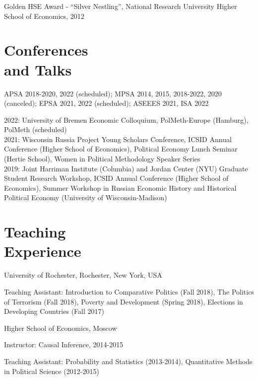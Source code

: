 \documentclass[margin,line,10.95pt]{res}
\newenvironment{list1}{
  \begin{list}{\ding{113}}{%
      \setlength{\itemsep}{0in}
      \setlength{\parsep}{0in} \setlength{\parskip}{0in}
      \setlength{\topsep}{0in} \setlength{\partopsep}{0in}
      \setlength{\leftmargin}{0.17in}}}{\end{list}}
\begin{document}
\begin{resume}
Golden HSE Award - ``Silver Nestling'', National Research University Higher School of Economics, 2012
\vspace*{-2.5mm}


\section{\sc Conferences \\ and Talks}

APSA 2018-2020, 2022 (scheduled); MPSA 2014, 2015, 2018-2022, 2020 (canceled); EPSA 2021, 2022 (scheduled); ASEEES 2021, ISA 2022
  \vspace*{-4.5mm} 

2022: University of Bremen Economic Colloquium, PolMeth-Europe (Hamburg), PolMeth (scheduled)
\\
2021: Wisconsin Russia Project Young Scholars Conference, ICSID Annual Conference (Higher School of Economics), Political Economy Lunch Seminar (Hertie School), Women in Political Methodology Speaker Series
\\
2019: Joint Harriman Institute (Columbia) and Jordan Center (NYU) Graduate Student Research Workshop,  ICSID Annual Conference (Higher School of Economics), Summer Workshop in Russian Economic History and Historical Political Economy (University of Wisconsin-Madison) 


\section{\sc Teaching \\ Experience}

{University of Rochester}, Rochester, New York, USA\\
\vspace*{-.1in}
\begin{list1}
\item[] Teaching Assistant: Introduction to Comparative Politics (Fall 2018),  The Politics of Terrorism (Fall 2018), Poverty and Development (Spring 2018), Elections in Developing Countries (Fall 2017) 
\end{list1}

\vspace{-3mm}
{Higher School of Economics, Moscow}\\
\vspace*{-.1in}
\begin{list1}
	\item[] Instructor: Causal Inference, 2014-2015
	\item[] Teaching Assistant: Probability and Statistics (2013-2014), Quantitative Methods in Political Science (2012-2015)
\end{list1}


\end{resume}
\end{document}
